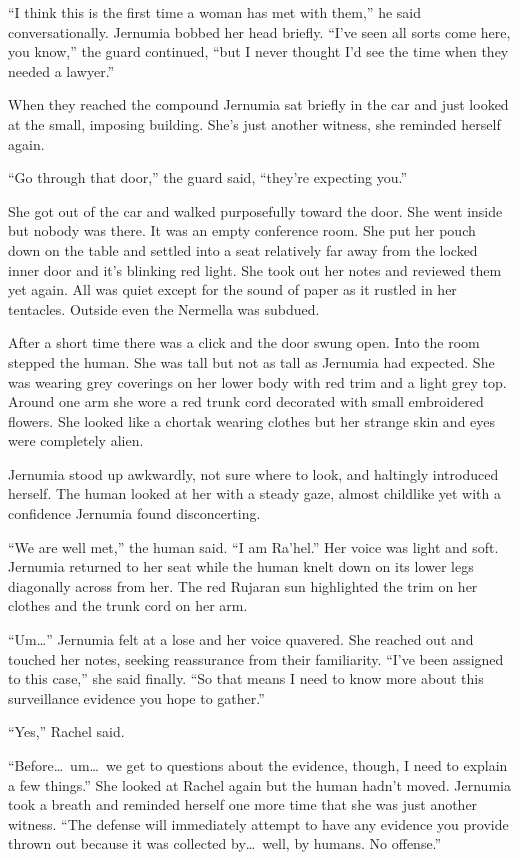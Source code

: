 ``I think this is the first time a woman has met with them,'' he said conversationally. Jernumia
bobbed her head briefly. ``I've seen all sorts come here, you know,'' the guard continued, ``but
I never thought I'd see the time when they needed a lawyer.''

When they reached the compound Jernumia sat briefly in the car and just looked at the small,
imposing building. She's just another witness, she reminded herself again.

``Go through that door,'' the guard said, ``they're expecting you.''

She got out of the car and walked purposefully toward the door. She went inside but nobody was
there. It was an empty conference room. She put her pouch down on the table and settled into a
seat relatively far away from the locked inner door and it's blinking red light. She took out
her notes and reviewed them yet again. All was quiet except for the sound of paper as it rustled
in her tentacles. Outside even the Nermella was subdued.

After a short time there was a click and the door swung open. Into the room stepped the human.
She was tall but not as tall as Jernumia had expected. She was wearing grey coverings on her
lower body with red trim and a light grey top. Around one arm she wore a red trunk cord
decorated with small embroidered flowers. She looked like a chortak wearing clothes but her
strange skin and eyes were completely alien.

Jernumia stood up awkwardly, not sure where to look, and haltingly introduced herself. The human
looked at her with a steady gaze, almost childlike yet with a confidence Jernumia found
disconcerting.

``We are well met,'' the human said. ``I am Ra'hel.'' Her voice was light and soft. Jernumia
returned to her seat while the human knelt down on its lower legs diagonally across from her.
The red Rujaran sun highlighted the trim on her clothes and the trunk cord on her arm.

``Um\ldots'' Jernumia felt at a lose and her voice quavered. She reached out and touched her
notes, seeking reassurance from their familiarity. ``I've been assigned to this case,'' she said
finally. ``So that means I need to know more about this surveillance evidence you hope to
gather.''

``Yes,'' Rachel said.

``Before\ldots\ um\ldots\ we get to questions about the evidence, though, I need to explain a
few things.'' She looked at Rachel again but the human hadn't moved. Jernumia took a breath and
reminded herself one more time that she was just another witness. ``The defense will immediately
attempt to have any evidence you provide thrown out because it was collected by\ldots\ well, by
humans. No offense.''

